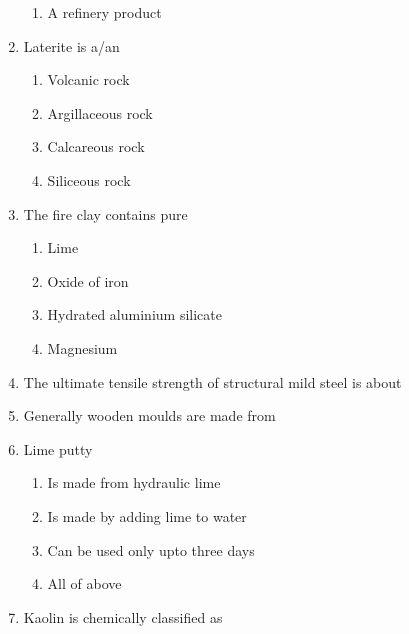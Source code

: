 \documentclass[11pt,a4paper]{article}
\begin{document}
\begin{enumerate}
\begin{enumerate}[label=\Alph*.]
\item{A refinery product}
\end{enumerate}
\item{Laterite is a/an}
\begin{enumerate}[label=\Alph*.]
\item{Volcanic rock}
\item{Argillaceous rock}
\item{Calcareous rock}
\item{Siliceous rock}
\end{enumerate}
\item{The fire clay contains pure}
\begin{enumerate}[label=\Alph*.]
\item{Lime}
\item{Oxide of iron}
\item{Hydrated aluminium silicate}
\item{Magnesium}
\end{enumerate}
\item{The ultimate tensile strength of structural mild steel is about}
\\
\item{Generally wooden moulds are made from}
\\
\item{Lime putty}
\begin{enumerate}[label=\Alph*.]
\item{Is made from hydraulic lime}
\item{Is made by adding lime to water}
\item{Can be used only upto three days}
\item{All of above}
\end{enumerate}
\item{Kaolin is chemically classified as}

\end{enumerate}
\end{document}

